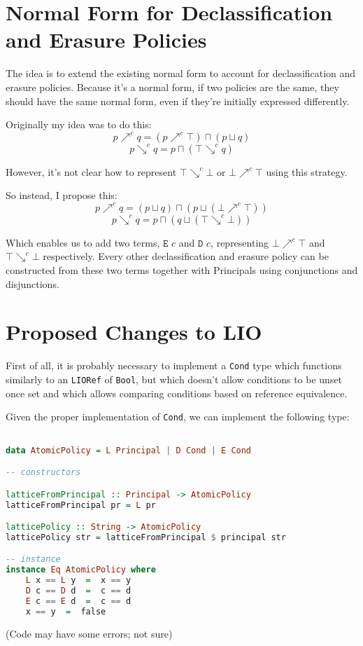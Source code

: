 \documentclass[11pt, oneside]{article}   	%
\begin{document}
\section{Normal Form for Declassification and Erasure Policies}
The idea is to extend the existing normal form to account for declassification and erasure policies. Because it's a normal form, if two policies are the same, they should have the same normal form, even if they're initially expressed differently.

Originally my idea was to do this:
$$p\nearrow^c q = (p\nearrow^c\top) \sqcap (p\sqcup q)$$
$$p\searrow^c q = p \sqcap (\top\searrow^c q)$$

However, it's not clear how to represent $\top\searrow^c\bot$ or $\bot\nearrow^c\top$ using this strategy.

So instead, I propose this:
$$p\nearrow^c q = (p\sqcup q) \sqcap (p \sqcup(\bot\nearrow^c\top))$$
$$p\searrow^c q = p \sqcap (q \sqcup (\top\searrow^c \bot))$$

Which enables us to add two terms, $\texttt{E }c$ and $\texttt{D }c$, representing $\bot\nearrow^c\top$ and $\top\searrow^c\bot$ respectively.
Every other declassification and erasure policy can be constructed from these two terms together with Principals using conjunctions and disjunctions.

\section{Proposed Changes to LIO}

First of all, it is probably necessary to implement a \texttt{Cond} type which functions similarly to an \texttt{LIORef} of \texttt{Bool}, but which doesn't allow conditions to be unset once set and which allows comparing conditions based on reference equivalence.

Given the proper implementation of \texttt{Cond}, we can implement the following type:

\begin{lstlisting}[language=Haskell]

data AtomicPolicy = L Principal | D Cond | E Cond

-- constructors

latticeFromPrincipal :: Principal -> AtomicPolicy
latticeFromPrincipal pr = L pr

latticePolicy :: String -> AtomicPolicy
latticePolicy str = latticeFromPrincipal $ principal str

-- instance
instance Eq AtomicPolicy where
	L x == L y  =  x == y
	D c == D d  =  c == d
	E c == E d  =  c == d
	x == y  =  false
\end{lstlisting}
(Code may have some errors; not sure)
\end{document}
